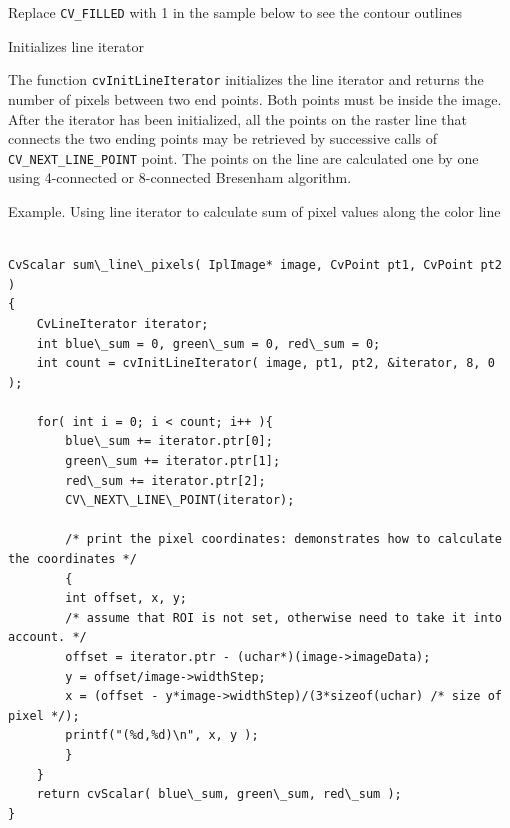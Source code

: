 Replace \texttt{CV\_FILLED} with 1 in the sample below to see the contour outlines

\label{InitLineIterator}

Initializes line iterator


\begin{description}
\end{description}

The function \texttt{cvInitLineIterator} initializes the line
iterator and returns the number of pixels between two end points.
Both points must be inside the image. After the iterator has been
initialized, all the points on the raster line that connects the
two ending points may be retrieved by successive calls of
\texttt{CV\_NEXT\_LINE\_POINT} point. The points on the line are
calculated one by one using 4-connected or 8-connected Bresenham
algorithm.

Example. Using line iterator to calculate sum of pixel values along the color line

\begin{lstlisting}

CvScalar sum\_line\_pixels( IplImage* image, CvPoint pt1, CvPoint pt2 )
{
    CvLineIterator iterator;
    int blue\_sum = 0, green\_sum = 0, red\_sum = 0;
    int count = cvInitLineIterator( image, pt1, pt2, &iterator, 8, 0 );

    for( int i = 0; i < count; i++ ){
        blue\_sum += iterator.ptr[0];
        green\_sum += iterator.ptr[1];
        red\_sum += iterator.ptr[2];
        CV\_NEXT\_LINE\_POINT(iterator);

        /* print the pixel coordinates: demonstrates how to calculate the coordinates */
        {
        int offset, x, y;
        /* assume that ROI is not set, otherwise need to take it into account. */
        offset = iterator.ptr - (uchar*)(image->imageData);
        y = offset/image->widthStep;
        x = (offset - y*image->widthStep)/(3*sizeof(uchar) /* size of pixel */);
        printf("(%d,%d)\n", x, y );
        }
    }
    return cvScalar( blue\_sum, green\_sum, red\_sum );
}

\end{lstlisting}


